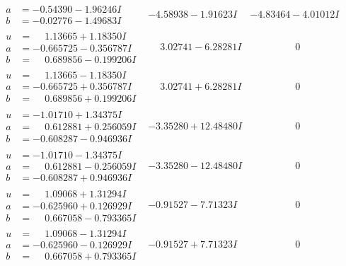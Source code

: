 \documentclass[1p]{elsarticle_modified}
\theoremstyle{definition}
\begin{document}
$$\begin{array}{c|c|c}
\begin{aligned}
a &= -0.54390 - 1.96246 I \\
b &= -0.02776 - 1.49683 I\end{aligned}
 & -4.58938 - 1.91623 I & -4.83464 - 4.01012 I \\ \hline\begin{aligned}
u &= \phantom{-}1.13665 + 1.18350 I \\
a &= -0.665725 - 0.356787 I \\
b &= \phantom{-}0.689856 - 0.199206 I\end{aligned}
 & \phantom{-}3.02741 - 6.28281 I & \phantom{-0.000000 } 0 \\ \hline\begin{aligned}
u &= \phantom{-}1.13665 - 1.18350 I \\
a &= -0.665725 + 0.356787 I \\
b &= \phantom{-}0.689856 + 0.199206 I\end{aligned}
 & \phantom{-}3.02741 + 6.28281 I & \phantom{-0.000000 } 0 \\ \hline\begin{aligned}
u &= -1.01710 + 1.34375 I \\
a &= \phantom{-}0.612881 + 0.256059 I \\
b &= -0.608287 - 0.946936 I\end{aligned}
 & -3.35280 + 12.48480 I & \phantom{-0.000000 } 0 \\ \hline\begin{aligned}
u &= -1.01710 - 1.34375 I \\
a &= \phantom{-}0.612881 - 0.256059 I \\
b &= -0.608287 + 0.946936 I\end{aligned}
 & -3.35280 - 12.48480 I & \phantom{-0.000000 } 0 \\ \hline\begin{aligned}
u &= \phantom{-}1.09068 + 1.31294 I \\
a &= -0.625960 + 0.126929 I \\
b &= \phantom{-}0.667058 - 0.793365 I\end{aligned}
 & -0.91527 - 7.71323 I & \phantom{-0.000000 } 0 \\ \hline\begin{aligned}
u &= \phantom{-}1.09068 - 1.31294 I \\
a &= -0.625960 - 0.126929 I \\
b &= \phantom{-}0.667058 + 0.793365 I\end{aligned}
 & -0.91527 + 7.71323 I & \phantom{-0.000000 } 0 \\ \hline\begin{aligned}

\end{aligned}
\end{array}$$
\end{document}
